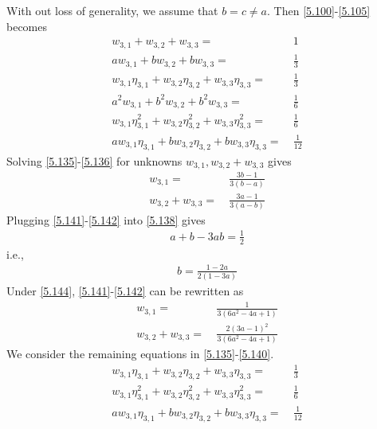 \documentclass[a4paper]{article}
\numberwithin{equation}{section}
\begin{document}
\begin{enumerate}
With out loss of generality, we assume that $b=c \ne a$. Then \eqref{5.100}-\eqref{5.105} becomes
\begin{align}
\label{5.135}
{w_{3,1}} + {w_{3,2}} + {w_{3,3}} =&\ 1\\
a{w_{3,1}} + b{w_{3,2}} + b{w_{3,3}} =&\ \frac{1}{3}\label{5.136}\\
{w_{3,1}}{\eta _{3,1}} + {w_{3,2}}{\eta _{3,2}} + {w_{3,3}}{\eta _{3,3}} =&\ \frac{1}{3}\label{5.137}\\
{a^2}{w_{3,1}} + {b^2}{w_{3,2}} + {b^2}{w_{3,3}} =&\ \frac{1}{6}\label{5.138}\\
{w_{3,1}}\eta _{3,1}^2 + {w_{3,2}}\eta _{3,2}^2 + {w_{3,3}}\eta _{3,3}^2 =&\ \frac{1}{6}\label{5.139}\\
a{w_{3,1}}{\eta _{3,1}} + b{w_{3,2}}{\eta _{3,2}} + b{w_{3,3}}{\eta _{3,3}} =&\ \frac{1}{{12}} \label{5.140}
\end{align}
Solving \eqref{5.135}-\eqref{5.136} for unknowns $w_{3,1},w_{3,2}+w_{3,3}$ gives
\begin{align}
\label{5.141}
{w_{3,1}} =&\ \frac{{3b - 1}}{{3\left( {b - a} \right)}}\\
{w_{3,2}} + {w_{3,3}} =&\ \frac{{3a - 1}}{{3\left( {a - b} \right)}} \label{5.142}
\end{align}
Plugging \eqref{5.141}-\eqref{5.142} into \eqref{5.138} gives
\begin{align}
a + b - 3ab = \frac{1}{2}
\end{align}
i.e.,
\begin{align}
\label{5.144}
b = \frac{{1 - 2a}}{{2\left( {1 - 3a} \right)}}
\end{align}
Under \eqref{5.144}, \eqref{5.141}-\eqref{5.142} can be rewritten as
\begin{align}
\label{5.145}
{w_{3,1}} =&\ \frac{1}{{3\left( {6{a^2} - 4a + 1} \right)}}\\
{w_{3,2}} + {w_{3,3}} =&\ \frac{{2{{\left( {3a - 1} \right)}^2}}}{{3\left( {6{a^2} - 4a + 1} \right)}}
\end{align}
We consider the remaining equations in \eqref{5.135}-\eqref{5.140}.
\begin{align}
\label{5.147}
{w_{3,1}}{\eta _{3,1}} + {w_{3,2}}{\eta _{3,2}} + {w_{3,3}}{\eta _{3,3}} =&\ \frac{1}{3}\\
{w_{3,1}}\eta _{3,1}^2 + {w_{3,2}}\eta _{3,2}^2 + {w_{3,3}}\eta _{3,3}^2 =&\ \frac{1}{6}\\
a{w_{3,1}}{\eta _{3,1}} + b{w_{3,2}}{\eta _{3,2}} + b{w_{3,3}}{\eta _{3,3}} =&\ \frac{1}{{12}} \label{5.149}
\end{align}

\end{enumerate}
\end{document}
